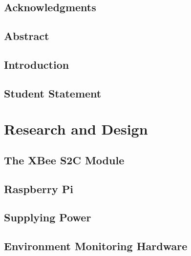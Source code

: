 \documentclass[letter,twocolumn]{report}
\date{February 15, 2020}
\author{Nathan Louck}
\begin{document}
	\large
	\begin{titlepage}
		
	
	\newpage
		\section{Acknowledgments}
		
	\end{titlepage}
		
	\subsection{Abstract}
		
	\subsection{Introduction}
		

	
	
	\subsection{Student Statement}
		

	\tableofcontents
	\listoffigures

	\section{Research and Design}
		\subsection{The XBee S2C Module}
			
		\subsection{Raspberry Pi}
			
		
		\subsection{Supplying Power}
			
	
	\subsection{Environment Monitoring Hardware}
		
	
\end{document}
